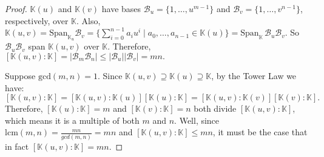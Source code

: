 \documentclass[addpoints,10pt]{exam}
\theoremstyle{plain}
\theoremstyle{definition}
\theoremstyle{plain}
\theoremstyle{plain}
\theoremstyle{definition}
\newcommand{\KK}{\ensuremath{\mathbb{K}}}
\newcommand{\BB}{\ensuremath{\mathcal{B}}}
\newcommand{\Span}{\ensuremath{\mathrm{Span}}}
\begin{document}
\begin{proof}
$\KK(u)$ and $\KK(v)$ have bases $\BB_{u}=\{1,\hdots,u^{m-1}\}$ and $\BB_{v}=\{1,\hdots, v^{n-1}\}$, respectively, over $\KK$. Also, $\KK(u,v)=\Span_{\KK_{u}}\BB_{v}=\{\sum_{i=0}^{n-1}a_{i}u^{i}\mid a_{0},\hdots,a_{n-1}\in \KK(u)\}=\Span_{\KK}\,\BB_{u}\BB_{v}$. So $\BB_{u}\BB_{v}$ span $\KK(u,v)$ over $\KK$. Therefore, $[\KK(u,v):\KK]=|\BB_{m}\BB_{n}|\leq |\BB_{u}||\BB_{v}|=mn.$

Suppose $\mathrm{gcd}(m,n)=1$. Since $\KK(u,v)\supseteq \KK(u)\supseteq \KK$, by the Tower Law we have:
  $$[\KK(u,v):\KK]=[\KK(u,v):\KK(u)][\KK(u):\KK]=[\KK(u,v):\KK(v)][\KK(v):\KK].$$
Therefore, $[\KK(u):\KK]=m$ and $[\KK(v):\KK]=n$ both divide $[\KK(u,v):\KK]$, which means it is a multiple of both $m$ and $n$. Well, since $\mathrm{lcm}(m,n)=\frac{mn}{gcd(m,n)}=mn$ and $[\KK(u,v):\KK]\leq mn$, it must be the case that in fact $[\KK(u,v):\KK]=mn$.

\end{proof}
\newpage
\end{document}
